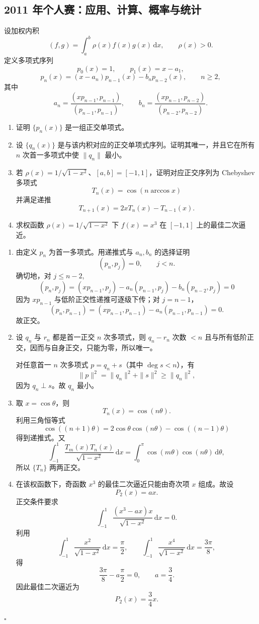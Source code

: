 \documentclass[UTF8,12pt]{ctexart}
\newcommand{\dd}{\,\mathrm d}
\newcounter{problem}
\newenvironment{problem}[1][]{%
  \refstepcounter{problem}
  \par\bigskip
  \noindent{\large\bfseries 题目 \theproblem\if\relax\detokenize{#1}\relax\else\quad #1\fi}\par
  \smallskip
  \noindent\ignorespaces
}{\par}
\newenvironment{solution}{%
  \par\medskip
  \noindent{\bfseries 解答}\quad\ignorespaces
}{\hfill$\square$\par\medskip}
\begin{document}
\subsection{2011 年个人赛：应用、计算、概率与统计}

\begin{problem}
设加权内积
\[
(f,g)=\int_a^b\rho(x)f(x)g(x)\dd x,\qquad \rho(x)>0.
\]
定义多项式序列
\[
p_0(x)=1,\qquad p_1(x)=x-a_1,
\]
\[
p_n(x)=(x-a_n)p_{n-1}(x)-b_np_{n-2}(x),\qquad n\ge2,
\]
其中
\[
a_n=\frac{(xp_{n-1},p_{n-1})}{(p_{n-1},p_{n-1})},\qquad
b_n=\frac{(xp_{n-1},p_{n-2})}{(p_{n-2},p_{n-2})}.
\]
\begin{enumerate}[label=(\alph*)]
\item 证明 \(\{p_n(x)\}\) 是一组正交单项式。
\item 设 \(\{q_n(x)\}\) 是与该内积对应的正交单项式序列。证明其唯一，并且它在所有 \(n\) 次首一多项式中使 \(\|q_n\|\) 最小。
\item 若 \(\rho(x)=1/\sqrt{1-x^2}\)、\([a,b]=[-1,1]\)，证明对应正交序列为 Chebyshev 多项式
\[
T_n(x)=\cos(n\arccos x)
\]
并满足递推
\[
T_{n+1}(x)=2xT_n(x)-T_{n-1}(x).
\]
\item 求权函数 \(\rho(x)=1/\sqrt{1-x^2}\) 下 \(f(x)=x^3\) 在 \([-1,1]\) 上的最佳二次逼近。
\end{enumerate}
\end{problem}

\begin{solution}
\begin{enumerate}[label=(\alph*)]
\item 由定义 \(p_n\) 为首一多项式。用递推式与 \(a_n,b_n\) 的选择证明
\[
(p_n,p_j)=0,\qquad j<n.
\]
确切地，对 \(j\le n-2\),
\[
(p_n,p_j)=(xp_{n-1},p_j)-a_n(p_{n-1},p_j)-b_n(p_{n-2},p_j)=0
\]
因为 \(xp_{n-1}\) 与低阶正交性递推可逐级下传；对 \(j=n-1\)，
\[
(p_n,p_{n-1})=(xp_{n-1},p_{n-1})-a_n(p_{n-1},p_{n-1})=0.
\]
故正交。

\item 设 \(q_n\) 与 \(r_n\) 都是首一正交 \(n\) 次多项式，则 \(q_n-r_n\) 次数 \(<n\) 且与所有低阶正交，因而与自身正交，只能为零，所以唯一。

对任意首一 \(n\) 次多项式 \(p=q_n+s\)（其中 \(\deg s<n\)），有
\[
\|p\|^2=\|q_n\|^2+\|s\|^2\ge\|q_n\|^2,
\]
因为 \(q_n\perp s\)。故 \(q_n\) 最小。

\item 取 \(x=\cos\theta\)，则
\[
T_n(x)=\cos(n\theta).
\]
利用三角恒等式
\[
\cos((n+1)\theta)=2\cos\theta\cos(n\theta)-\cos((n-1)\theta)
\]
得到递推式。又
\[
\int_{-1}^1\frac{T_m(x)T_n(x)}{\sqrt{1-x^2}}\dd x
=\int_0^\pi \cos(m\theta)\cos(n\theta)\dd\theta,
\]
所以 \(\{T_n\}\) 两两正交。

\item 在该权函数下，奇函数 \(x^3\) 的最佳二次逼近只能由奇次项 \(x\) 组成。故设
\[
P_2(x)=ax.
\]
正交条件要求
\[
\int_{-1}^1\frac{(x^3-ax)x}{\sqrt{1-x^2}}\dd x=0.
\]
利用
\[
\int_{-1}^1\frac{x^2}{\sqrt{1-x^2}}\dd x=\frac\pi2,\qquad
\int_{-1}^1\frac{x^4}{\sqrt{1-x^2}}\dd x=\frac{3\pi}{8},
\]
得
\[
 \frac{3\pi}{8}-a\frac{\pi}{2}=0,\qquad a=\frac34.
\]
因此最佳二次逼近为
\[
P_2(x)=\frac34x.
\]
\end{enumerate}
\end{solution}
\end{document}
